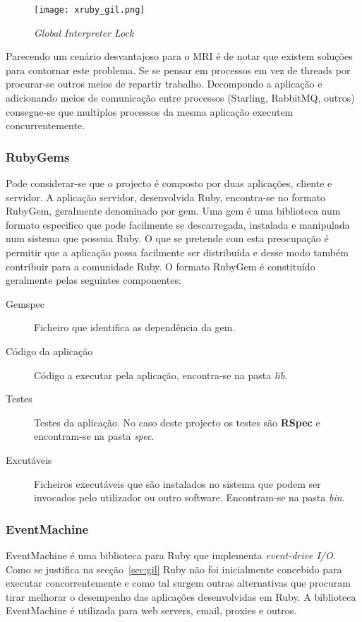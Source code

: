 \begin{figure}[H]
\centering
\texttt{[image: xruby\_gil.png]}
\caption{\textit{Global Interpreter Lock}}
\label{fig:ruby-gil}
\end{figure}

Parecendo um cenário desvantajoso para o MRI é de notar que existem soluções para contornar este problema. Se se pensar em processos em vez de threads por procurar-se outros meios de repartir trabalho. Decompondo a aplicação e adicionando meios de comunicação entre processos (Starling, RabbitMQ, outros) consegue-se que multiplos processos da mesma aplicação executem concurrentemente.

\subsubsection{RubyGems}

Pode considerar-se que o projecto é composto por duas aplicações, cliente e servidor. A aplicação servidor, desenvolvida Ruby, encontra-se no formato RubyGem, geralmente denominado por gem. Uma gem é uma biblioteca num formato especifico que pode facilmente se descarregada, instalada e manipulada num sistema que possuia Ruby.\cite{rubygems} O que se pretende com esta preocupação é permitir que a aplicação possa facilmente ser distribuída e desse modo também contribuir para a comunidade Ruby. O formato RubyGem é constituído geralmente pelas seguintes componentes:

\begin{description}%
\item[Gemspec] Ficheiro que identifica as dependência da gem.
\item[Código da aplicação] Código a executar pela aplicação, encontra-se na pasta \textit{lib}.
\item[Testes] Testes da aplicação. No caso deste projecto os testes são \textbf{RSpec} e encontram-se na pasta \textit{spec}.
\item[Excutáveis] Ficheiros executáveis que são instalados no sistema que podem ser invocados pelo utilizador ou outro software. Encontram-se na pasta \textit{bin}.
\end{description}

\subsubsection{EventMachine}
\label{sec:eventmachine}
EventMachine é uma biblioteca para Ruby que implementa \textit{event-drive I/O}. Como se justifica na secção~\ref{sec:gil} Ruby não foi inicialmente concebido para executar concorrentemente e como tal surgem outras alternativas que procuram tirar melhorar o desempenho das aplicações desenvolvidas em Ruby. A biblioteca EventMachine é utilizada para web servers, email, proxies e outros.

